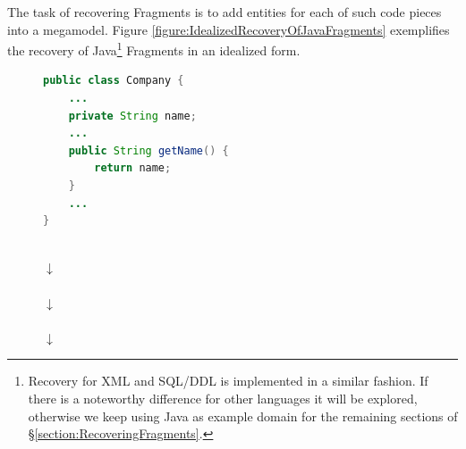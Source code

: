 The task of recovering \glspl{Fragment} is to add entities for each of such code pieces into a megamodel.
Figure \ref{figure:IdealizedRecoveryOfJavaFragments} exemplifies the recovery of \gls{Java}\footnote{Recovery for \gls{XML} and \gls{SQL/DDL} is implemented in a similar fashion.
If there is a noteworthy difference for other languages it will be explored, otherwise we keep using \gls{Java} as example domain for the remaining sections of §\ref{section:RecoveringFragments}.} \glspl{Fragment} in an idealized form.
\begin{figure}[h!]
\begin{center}
\begin{minipage}{0.5\textwidth}
\begin{lstlisting}[language=Java,numbers=none]
public class Company {
	...
	private String name;
	...
	public String getName() {
		return name;
	}
	...
}
\end{lstlisting}
\end{minipage}
\\\vspace*{5mm}
{
\LARGE
\bfseries
$\downarrow$
}
\\\vspace*{5mm}
\\\vspace*{5mm}
{
\LARGE
\bfseries
$\downarrow$
}
\\\vspace*{5mm}
\\\vspace*{5mm}
{
\LARGE
\bfseries
$\downarrow$
}
\\\vspace*{5mm}

\end{center}
\end{figure}
